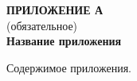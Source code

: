 \clearpage
{}
\begin{center}
	\textbf{ПРИЛОЖЕНИЕ А}\\
	(обязательное)\\
	\textbf{Название приложения}
\end{center}

Содержимое приложения.
